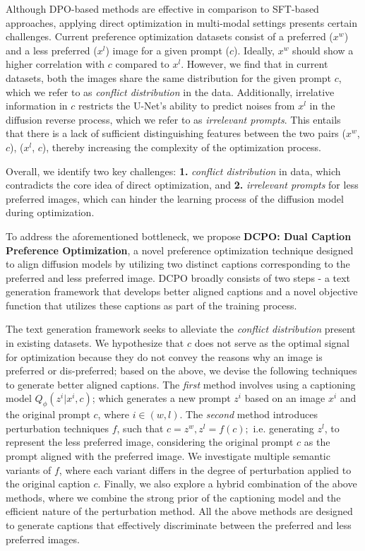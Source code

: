 Although DPO-based methods are effective in comparison to SFT-based approaches, applying direct optimization in multi-modal settings presents certain challenges. Current preference optimization datasets consist of a preferred ($x^w$) and a less preferred ($x^l$) image for a given prompt ($c$). Ideally, $x^w$ should show a higher correlation with $c$ compared to $x^l$. However, we find that in current datasets, both the images share the same distribution for the given prompt $c$, which we refer to as \textit{conflict distribution} in the data. Additionally, irrelative information in $c$ restricts the U-Net's ability to predict noises from $x^l$ in the diffusion reverse process, which we refer to as \textit{irrelevant prompts}.
This entails that there is a lack of sufficient distinguishing features between the two pairs ($x^w$, $c$), ($x^l$, $c$), thereby increasing the complexity of the optimization process. 

Overall, we identify two key challenges: \textbf{1.} \textit{conflict distribution} in data, which contradicts the core idea of direct optimization, and \textbf{2.} \textit{irrelevant prompts} for less preferred images, which can hinder the learning process of the diffusion model during optimization.

To address the aforementioned bottleneck, we propose \textbf{DCPO: Dual Caption Preference Optimization}, a novel preference optimization technique designed to align diffusion models by utilizing two distinct captions corresponding to the preferred and less preferred image. DCPO broadly consists of two steps - a text generation framework that develops better aligned captions and a novel objective function that utilizes these captions as part of the training process.

The text generation framework seeks to alleviate the \textit{conflict distribution} present in existing datasets. We hypothesize that $c$ does not serve as the optimal signal for optimization because they do not convey the reasons why an image is preferred or dis-preferred; based on the above, we devise the following techniques to generate better aligned captions. The \textit{first} method involves using a captioning model $Q_\phi(z^i|x^i, c)$; which generates a new prompt ${z^i}$ based on an image ${x^i}$ and the original prompt ${c}$, where $i \in (w, l)$. The \textit{second} method introduces perturbation techniques $f$, such that $c=z^w, z^l = f(c);$ i.e. generating $z^l$, to represent the less preferred image, considering the original prompt $c$ as the prompt aligned with the preferred image. We investigate multiple semantic variants of $f$, where each variant differs in the degree of perturbation applied to the original caption $c$. Finally, we also explore a hybrid combination of the above methods, where we combine the strong prior of the captioning model and the efficient nature of the perturbation method. All the above methods are designed to generate captions that effectively discriminate between the preferred and less preferred images.

